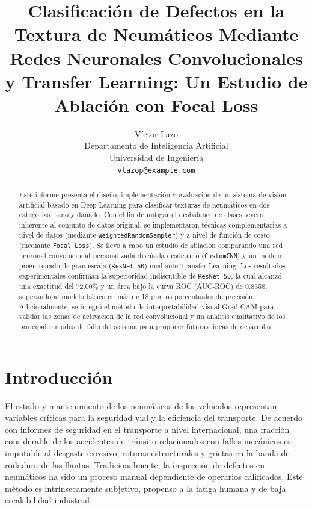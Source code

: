 \documentclass{article}
\title{Clasificación de Defectos en la Textura de Neumáticos Mediante Redes Neuronales Convolucionales y Transfer Learning: Un Estudio de Ablación con Focal Loss}
\author{%
  Víctor Lazo \\
  Departamento de Inteligencia Artificial \\
  Universidad de Ingeniería \\
  \texttt{vlazop@example.com} \\
}
\begin{document}
\maketitle

\begin{abstract}
Este informe presenta el diseño, implementación y evaluación de un sistema de visión artificial basado en Deep Learning para clasificar texturas de neumáticos en dos categorías: sano y dañado. Con el fin de mitigar el desbalance de clases severo inherente al conjunto de datos original, se implementaron técnicas complementarias a nivel de datos (mediante \texttt{WeightedRandomSampler}) y a nivel de función de costo (mediante \texttt{Focal Loss}). Se llevó a cabo un estudio de ablación comparando una red neuronal convolucional personalizada diseñada desde cero (\texttt{CustomCNN}) y un modelo preentrenado de gran escala (\texttt{ResNet-50}) mediante Transfer Learning. Los resultados experimentales confirman la superioridad indiscutible de \texttt{ResNet-50}, la cual alcanzó una exactitud del 72.00\% y un área bajo la curva ROC (AUC-ROC) de 0.8358, superando al modelo básico en más de 18 puntos porcentuales de precisión. Adicionalmente, se integró el método de interpretabilidad visual Grad-CAM para validar las zonas de activación de la red convolucional y un análisis cualitativo de los principales modos de fallo del sistema para proponer futuras líneas de desarrollo.
\end{abstract}

\section{Introducción}
El estado y mantenimiento de los neumáticos de los vehículos representan variables críticas para la seguridad vial y la eficiencia del transporte. De acuerdo con informes de seguridad en el transporte a nivel internacional, una fracción considerable de los accidentes de tránsito relacionados con fallos mecánicos es imputable al desgaste excesivo, roturas estructurales y grietas en la banda de rodadura de las llantas. Tradicionalmente, la inspección de defectos en neumáticos ha sido un proceso manual dependiente de operarios calificados. Este método es intrínsecamente subjetivo, propenso a la fatiga humana y de baja escalabilidad industrial.
\end{document}
